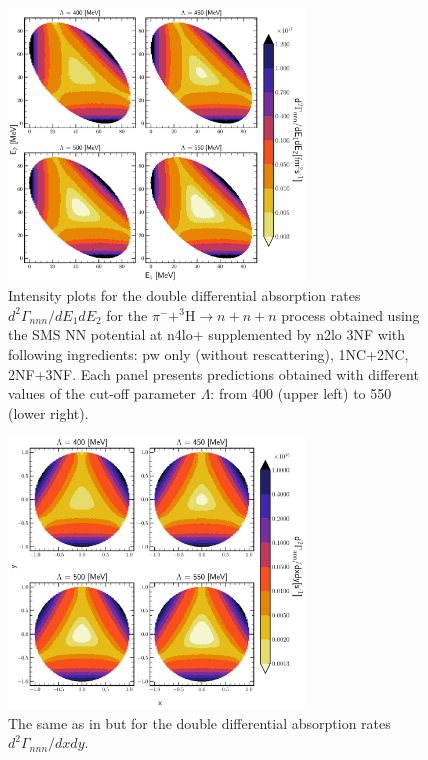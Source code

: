     \begin{figure}[h]
        \begin{center}
        \includegraphics[width=0.7\textwidth]{PlotData/PION/Dalitz_maps/figures/Dalitz_map_nnn_E1E2_cutofs_PW.pdf}
        \end{center}
        \caption{Intensity plots for the double differential absorption rates
        $d^2 \Gamma_{nnn}/dE_1dE_2$ for the $\pi^- + ^3\text{H} \rightarrow n + n + n$
        process obtained using the SMS NN potential at \gls{n4lo+} supplemented by \gls{n2lo} 3NF
        with following ingredients: \gls{pw} only (without rescattering), 1NC+2NC, 2NF+3NF.
        Each panel presents predictions obtained with different values of the cut-off parameter $\Lambda$:
        from \SI{400}{\mev} (upper left) to \SI{550}{\mev} (lower right).}
        \label{pion_nnn_E1E2_cutoff_PW}
    \end{figure}

    \begin{figure}[h]
        \begin{center}
        \includegraphics[width=0.7\textwidth]{PlotData/PION/Dalitz_maps/figures/Dalitz_map_nnn_xy_cutofs_PW.pdf}
        \end{center}
        \caption{The same as in  but for the double differential absorption rates
        $d^2 \Gamma_{nnn}/dxdy$.}
        \label{pion_nnn_xy_cutoff_PW}
    \end{figure}

